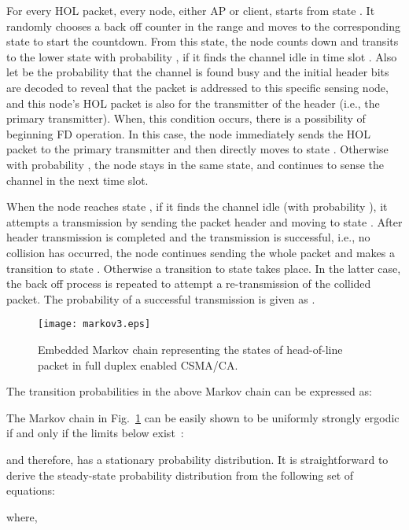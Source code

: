 \documentclass[10pt,journal,cspaper,compsoc]{IEEEtran}
\begin{document}
For every HOL packet, every node, either AP or client, starts from state . It randomly chooses a back off counter in the range  and moves to the corresponding state  to start the countdown. From this state, the node counts down and transits to the lower state with probability , if it finds the channel idle in time slot . Also let  be the probability that the channel is found busy and the initial header bits are decoded to reveal that the packet is addressed to this specific sensing node, and this node's HOL packet is also for the transmitter of the header (i.e., the primary transmitter). When, this condition occurs, there is a possibility of beginning FD operation. In this case, the node immediately sends the HOL packet to the primary transmitter and then directly moves to state . Otherwise with probability , the node stays in the same state, and continues to sense the channel in the next time slot. 

When the node reaches state , if it finds the channel idle (with probability ), it attempts a transmission by sending the packet header and moving to state . After header transmission is completed and the transmission is successful, i.e., no collision has occurred, the node continues sending the whole packet and makes a transition to state . Otherwise a transition to state  takes place. In the latter case, the back off process is repeated to attempt a re-transmission of the collided packet. The probability of a successful transmission is given as . 



\begin{figure}[!t]
\centering
\texttt{[image: markov3.eps]}
\caption{Embedded Markov chain representing the states of head-of-line packet in full duplex enabled CSMA/CA.}
\label{fig:markov}
\end{figure} 
The transition probabilities in the above Markov chain can be expressed as:
\small

\normalsize
The Markov chain in Fig.~\ref{fig:markov} can be easily shown to be uniformly strongly ergodic if and only if the limits below exist~\cite{Dai13,Iosifescu}:
\small

\normalsize
and therefore, has a stationary probability distribution. It is straightforward to derive the steady-state probability distribution from the following set of equations:

\small
 
\normalsize

where,
\end{document}

